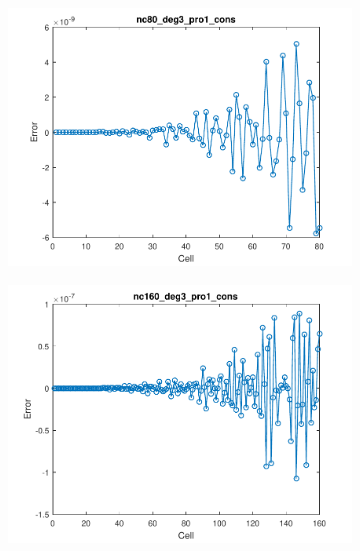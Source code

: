 \documentclass[11pt,a4paper]{article}
\theoremstyle{plain}
\theoremstyle{definition}
\begin{document}
\begin{figure}[H]
\medskip
\begin{subfigure}[b]{0.48\textwidth}
\includegraphics[width=\linewidth]{../../tests_01_01/test_01_01_test47_pro1_cons/output/plots/nc80_deg3_wei111_pro1_cons.pdf}
\end{subfigure}\hspace*{\fill}
\begin{subfigure}[b]{0.48\textwidth}
\includegraphics[width=\linewidth]{../../tests_01_01/test_01_01_test47_pro1_cons/output/plots/nc160_deg3_wei111_pro1_cons.pdf}
\end{subfigure}


\end{figure}
\end{document}
